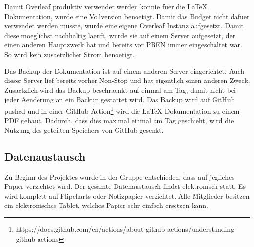 Damit Overleaf produktiv verwendet werden konnte fuer die LaTeX Dokumentation, wurde eine Vollversion benoetigt. Damit das Budget nicht dafuer verwendet werden musste, wurde eine eigene Overleaf Instanz aufgesetzt. Damit diese moeglichst nachhaltig laeuft, wurde sie auf einem Server aufgesetzt, der einen anderen Hauptzweck hat und bereits vor PREN immer eingeschaltet war. So wird kein zusaetzlicher Strom benoetigt.

Das Backup der Dokumentation ist auf einem anderen Server eingerichtet. Auch dieser Server lief bereits vorher Non-Stop und hat eigentlich einen anderen Zweck. Zusaetzlich wird das Backup beschraenkt auf einmal am Tag, damit nicht bei jeder Aenderung an ein Backup gestartet wird. Das Backup wird auf GitHub pushed und in einer GitHub Action\footnote{https://docs.github.com/en/actions/about-github-actions/understanding-github-actions} wird die LaTeX Dokumentation zu einem PDF gebaut. Dadurch, dass dies maximal einmal am Tag geschieht, wird die Nutzung des geteilten Speichers von GitHub gesenkt.

\subsection{Datenaustausch}

Zu Beginn des Projektes wurde in der Gruppe entschieden, dass auf jegliches Papier verzichtet wird. Der gesamte Datenaustausch findet elektronisch statt. Es wird komplett auf Flipcharts oder Notizpapier verzichtet. Alle Mitglieder besitzen ein elektronisches Tablet, welches Papier sehr einfach ersetzen kann.